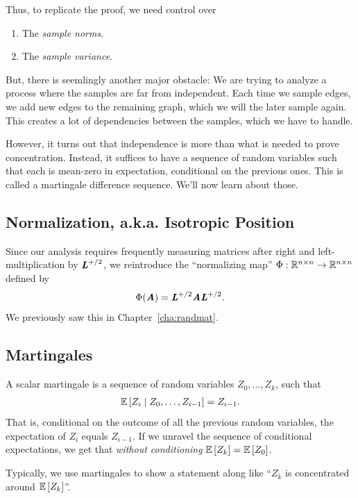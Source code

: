 Thus, to replicate the proof, we need control over
\begin{enumerate}
\item The \emph{sample norms}.
\item The \emph{sample variance}.

\end{enumerate}

But, there is seemlingly another major obstacle: We are trying to
analyze a process where the samples are far from independent.
Each time we sample edges, we add new edges to the remaining graph,
which we will the later sample again. This creates a lot of
dependencies between the samples, which we have to handle.

However, it turns out that independence is more than what is needed to
prove concentration. Instead, it suffices to have a sequence of random
variables such that each is mean-zero in expectation, conditional on
the previous ones. This is called a martingale difference sequence.
We'll now learn about those.

\subsection{Normalization, a.k.a. Isotropic Position}

Since our analysis requires frequently measuring matrices after right
and left-multiplication by $\boldsymbol{\mathit{L}}^{+/2}$, we reintroduce the
``normalizing map'' $\Phi : \mathbb{R}^{n\times n} \to
\mathbb{R}^{n\times n} $
defined by
\[
  \Phi(\boldsymbol{\mathit{A}}) = \boldsymbol{\mathit{L}}^{+/2}\boldsymbol{\mathit{A}}\boldsymbol{\mathit{L}}^{+/2}.
  \]
We previously saw this in Chapter~\ref{cha:randmat}.

\subsection{Martingales}

A scalar martingale is a sequence of random variables $Z_0, \ldots,
Z_k$, such that
\begin{align}
\label{eq:martingale}
  \mathop{{}\mathbb{E}}\left[Z_i \mid Z_0, \ldots, Z_{i-1}\right] = Z_{i-1}
.
\end{align}
That is, conditional on the outcome of all the previous random
variables, the expectation of $Z_{i}$ equals $Z_{i-1}$.
If we unravel the sequence of conditional expectations, we
get that \emph{without conditioning}
$\mathop{{}\mathbb{E}}\left[Z_k\right]=\mathop{{}\mathbb{E}}\left[Z_0\right]$.

Typically, we use martingales to show a statement along like  ``$Z_k$
is concentrated around $\mathop{{}\mathbb{E}}\left[Z_k\right]$''.

